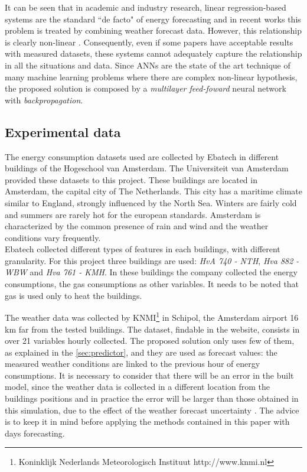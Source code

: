 \documentclass{sig-alternate-sigmod07}
\begin{document}
It can be seen that in academic and industry research, linear regression-based systems are the standard ``de facto" of energy forecasting and in recent works this problem is treated by combining weather forecast data. However, this relationship is clearly non-linear \cite{hippert2001neural}. Consequently, even if some papers have acceptable results with measured datasets, these systems cannot adequately capture the relationship in all the situations and data. Since ANNs are the state of the art technique of many machine learning problems where there are complex non-linear hypothesis, the proposed solution is composed by a \textit{multilayer feed-foward} neural network with \textit{backpropagation}. 


\subsection{Experimental data}
The energy consumption datasets used are collected by Ebatech in different buildings of the Hogeschool van Amsterdam. The Universiteit van Amsterdam provided these datasets to this project. These buildings are located in Amsterdam, the capital city of The Netherlands. This city has a maritime climate similar to England, strongly influenced by the North Sea. Winters are fairly cold and summers are rarely hot for the european standards. Amsterdam is characterized by the common presence of rain and wind and the weather conditions vary frequently.\\
Ebatech collected different types of features in each buildings, with different granularity. For this project three buildings are used: \textit{HvA 740 - NTH}, \textit{Hva 882 - WBW} and \textit{Hva 761 - KMH}. In these buildings the company collected the energy consumptions, the gas consumptions as other variables. It needs to be noted that gas is used only to heat the buildings.

The weather data was collected by KNMI\footnote{Koninklijk Nederlands Meteorologisch Instituut http://www.knmi.nl} in Schipol, the Amsterdam airport 16 km far from the tested buildings. The dataset, findable in the website, consists in over 21 variables hourly collected. The proposed solution only uses few of them, as explained in the \cref{sec:predictor}, and they are used as forecast values: the measured weather conditions are linked to the previous hour of energy consumptions. It is necessary to consider that there will be an error in the built model, since the weather data is collected in a different location from the buildings positions and in practice the error will be larger than those obtained in this simulation, due to the effect of the weather forecast uncertainty \cite{douglas1998impacts, ranaweera1996effect}. The advice is to keep it in mind before applying the methods contained in this paper with days forecasting.
\end{document}
